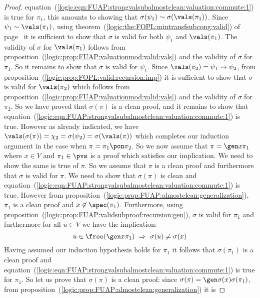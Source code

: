 \begin{proof}
equation~(\ref{logic:eqn:FUAP:strongvalsubalmostclean:valuation:commute:1})
is true for $\pi_{1}$, this amounts to showing that
$\sigma(\psi_{1})\sim\sigma(\vals(\pi_{1}))$. Since
$\psi_{1}\sim\vals(\pi_{1})$, using
theorem~(\ref{logic:the:FOPL:mintransfsubcong:valid}) of
page~\pageref{logic:the:FOPL:mintransfsubcong:valid} it is
sufficient to show that $\sigma$ is valid for both $\psi_{1}$ and
$\vals(\pi_{1})$. The validity of $\sigma$ for $\vals(\pi_{1})$
follows from
proposition~(\ref{logic:prop:FUAP:valuationmod:valid:vals}) and the
validity of $\sigma$ for $\pi_{1}$. So it remains to show that
$\sigma$ is valid for $\psi_{1}$. Since
$\vals(\pi_{2})=\psi_{1}\to\psi_{2}$, from
proposition~(\ref{logic:prop:FOPL:valid:recursion:imp}) it is
sufficient to show that $\sigma$ is valid for $\vals(\pi_{2})$ which
follows from
proposition~(\ref{logic:prop:FUAP:valuationmod:valid:vals}) and the
validity of $\sigma$ for $\pi_{2}$. So we have proved that
$\sigma(\pi)$ is a clean proof, and it remains to show that
equation~(\ref{logic:eqn:FUAP:strongvalsubalmostclean:valuation:commute:1})
is true. However as already indicated, we have
$\vals(\sigma(\pi))=\chi_{2}=\sigma(\psi_{2})=\sigma(\vals(\pi))$
which completes our induction argument in the case when
$\pi=\pi_{1}\pon\pi_{2}$. So we now assume that $\pi=\gen x\pi_{1}$
where $x\in V$ and $\pi_{1}\in\pvs$ is a proof which satisfies our
implication. We need to show the same is true of $\pi$. So we assume
that $\pi$ is a clean proof and furthermore that $\sigma$ is valid
for $\pi$. We need to show that $\sigma(\pi)$ is clean and
equation~(\ref{logic:eqn:FUAP:strongvalsubalmostclean:valuation:commute:1})
is true. However from
proposition~(\ref{logic:prop:FUAP:almostclean:generalization}),
$\pi_{1}$ is a clean proof and $x\not\in\spec(\pi_{1})$.
Furthermore, using
proposition~(\ref{logic:prop:FUAP:validsubproof:recursion:gen}),
$\sigma$ is valid for $\pi_{1}$ and furthermore for all $u\in V$ we
have the implication:
    \begin{equation}\label{logic:eqn:FUAP:validsubcleanproof:1:1}
    u\in\free(\gen x\pi_{1})\ \Rightarrow\
    \sigma(u)\neq\sigma(x)
    \end{equation}
Having assumed our induction hypothesis holds for $\pi_{1}$ it
follows that $\sigma(\pi_{1})$ is a clean proof and
equation~(\ref{logic:eqn:FUAP:strongvalsubalmostclean:valuation:commute:1})
is true for $\pi_{1}$. So let us prove that $\sigma(\pi)$ is a clean
proof: since $\sigma(\pi)=\gen\sigma(x)\sigma(\pi_{1})$, from
proposition~(\ref{logic:prop:FUAP:almostclean:generalization}) it is

\end{proof}

